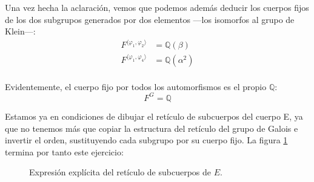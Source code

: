 \documentclass[a4paper, 11pt]{article}
\begin{document}
\begin{solucion}
      Una vez hecha la aclaración, vemos que podemos además deducir los cuerpos fijos de los dos subgrupos generados por dos elementos ---los isomorfos al grupo de Klein---:
      \begin{align*}
          F^{\langle\varphi_1,\varphi_2\rangle} &= \mathbb{Q}(\beta) \\
          F^{\langle\varphi_1,\varphi_4\rangle} &= \mathbb{Q}(\alpha^2) \\
      \end{align*}

      Evidentemente, el cuerpo fijo por todos los automorfismos es el propio $\mathbb{Q}$:
      \[
      F^G = \mathbb{Q}
      \]

      Estamos ya en condiciones de dibujar el retículo de subcuerpos del cuerpo E, ya que no tenemos más que copiar la estructura del retículo del grupo de Galois e invertir el orden, sustituyendo cada subgrupo por su cuerpo fijo. La figura \ref{retCuerpo} termina por tanto este ejercicio:

      \begin{figure}[ht!]
          \centering
          \caption{Expresión explícita del retículo de subcuerpos de $E$.}
          \label{retCuerpo}
      \end{figure}
  \end{solucion}
\end{document}
